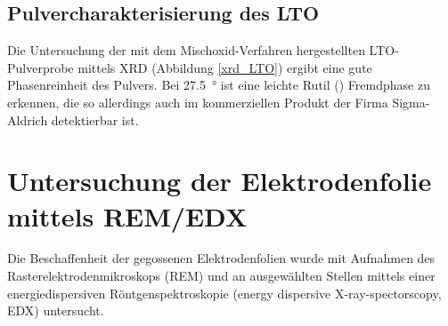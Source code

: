 \documentclass[a4paper, 11pt, headsepline,footsepline,twoside,abstract]{scrbook}
\begin{document}
\subsection{Pulvercharakterisierung des LTO}
Die Untersuchung der mit dem Mischoxid-Verfahren hergestellten LTO-Pulverprobe mittels XRD (Abbildung \ref{xrd_LTO}) ergibt eine gute Phasenreinheit des Pulvers. Bei \SI{27.5}{\degree} ist eine leichte Rutil () Fremdphase zu erkennen, die so allerdings auch im kommerziellen Produkt der Firma Sigma-Aldrich detektierbar ist. 
\section{Untersuchung der Elektrodenfolie mittels REM/EDX}
Die Beschaffenheit der gegossenen Elektrodenfolien wurde mit Aufnahmen des Rasterelektrodenmikroskops (REM) und an ausgewählten Stellen mittels einer energiedispersiven Röntgenspektroskopie (energy dispersive X-ray-spectorscopy, EDX) untersucht.
\end{document}
